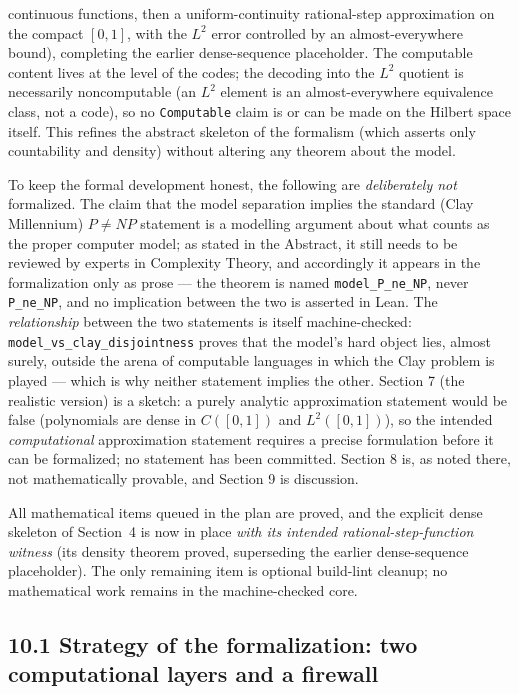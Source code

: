 \documentclass[11pt,a4paper]{report}
\begin{document}
\begin{itemize}
  continuous functions, then a uniform-continuity rational-step approximation on
  the compact \([0,1]\), with the \(L^{2}\) error controlled by an
  almost-everywhere bound), completing the earlier dense-sequence placeholder.
  The computable content lives at the level of the codes; the decoding into the
  \(L^{2}\) quotient is necessarily noncomputable (an \(L^{2}\) element is an
  almost-everywhere equivalence class, not a code), so no \texttt{Computable}
  claim is or can be made on the Hilbert space itself. This refines the abstract
  skeleton of the formalism (which asserts only countability and density) without
  altering any theorem about the model.
\end{itemize}

To keep the formal development honest, the following are
\emph{deliberately not} formalized. The claim that the model separation
implies the standard (Clay Millennium) \(P \neq NP\) statement is a
modelling argument about what counts as the proper computer model; as
stated in the Abstract, it still needs to be reviewed by experts in
Complexity Theory, and accordingly it appears in the formalization only
as prose --- the theorem is named \texttt{model\_P\_ne\_NP}, never
\texttt{P\_ne\_NP}, and no implication between the two is asserted in
Lean. The \emph{relationship} between the two statements is itself
machine-checked: \texttt{model\_vs\_clay\_disjointness} proves that the
model's hard object lies, almost surely, outside the arena of computable
languages in which the Clay problem is played --- which is why neither
statement implies the other. Section 7 (the realistic version) is a
sketch: a purely analytic
approximation statement would be false (polynomials are dense in
\(C([0,1])\) and \(L^{2}([0,1])\)), so the intended
\emph{computational} approximation statement requires a precise
formulation before it can be formalized; no statement has been committed.
Section 8 is, as noted there, not mathematically provable, and Section 9
is discussion.

All mathematical items queued in the plan are proved, and the explicit dense
skeleton of Section~4 is now in place \emph{with its intended rational-step-function
witness} (its density theorem proved, superseding the earlier dense-sequence
placeholder). The only remaining item is optional build-lint cleanup; no
mathematical work remains in the machine-checked core.

\subsection*{10.1 Strategy of the formalization: two computational layers and a
firewall}
\end{document}
